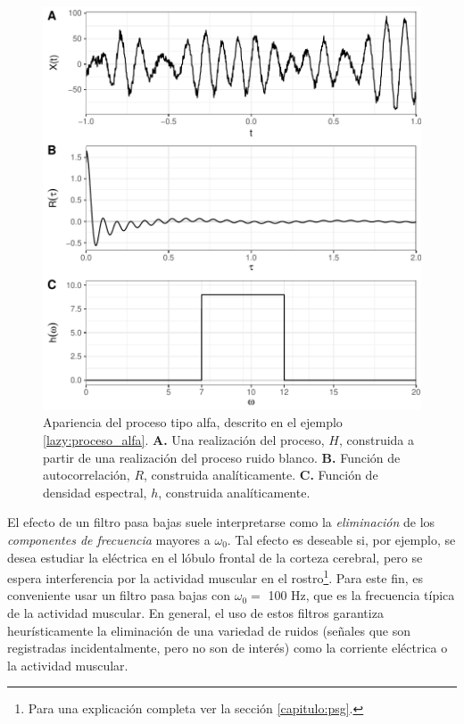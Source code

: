 \documentclass[12pt,letterpaper]{book}
\newcommand{\hz}{\si{\hertz}\xspace}
\begin{document}
\begin{figure}
\centering
\includegraphics[width=\linewidth]{./img_mas_ejemplos/proceso_alfa.pdf}
\caption[Apariencia del proceso tipo alfa]{Apariencia del proceso tipo alfa, descrito en el ejemplo \ref{lazy:proceso_alfa}. \textbf{A.} Una realización del proceso, $H$, construida a partir de una realización del proceso ruido blanco. \textbf{B.} Función de autocorrelación, $R$, construida analíticamente. \textbf{C.} Función de densidad espectral, $h$, construida analíticamente.}
\label{img:proceso_alfa}
\end{figure}

El efecto de un filtro pasa bajas suele interpretarse como la \textit{eliminación} de los \textit{componentes de frecuencia} mayores a $\omega_0$. 
%
Tal efecto es deseable si, por ejemplo, se desea estudiar la eléctrica en el lóbulo frontal de la corteza cerebral, pero se espera interferencia por la actividad muscular en el rostro\footnote{Para una explicación completa ver la sección \ref{capitulo:psg}.}.
%
Para este fin, es conveniente usar un filtro pasa bajas con $\omega_0 = $ 100 \hz, que es la frecuencia típica de la actividad muscular.
%
%
En general, el uso de estos filtros garantiza heurísticamente la eliminación de una variedad de ruidos (señales que son registradas incidentalmente, pero no son de interés) como la corriente eléctrica o la actividad muscular.
\end{document}
